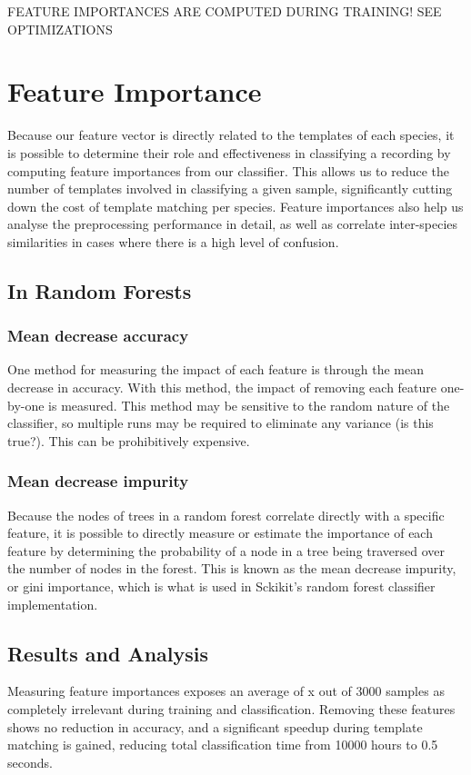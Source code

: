 FEATURE IMPORTANCES ARE COMPUTED DURING TRAINING! SEE OPTIMIZATIONS
\section{Feature Importance}\label{sec:feature_imp}
Because our feature vector is directly related to the templates of each species,
it is possible to determine their role and effectiveness in classifying a
recording by computing feature importances from our classifier.
This allows us to reduce the number of templates involved in classifying a given
sample, significantly cutting down the cost of template matching per species.
Feature importances also help us analyse the preprocessing performance in detail,
as well as correlate inter-species similarities in cases where there is a high
level of confusion.

\subsection{In Random Forests}

\subsubsection{Mean decrease accuracy}
One method for measuring the impact of each feature is through the mean decrease
in accuracy.
With this method, the impact of removing each feature one-by-one is measured.
This method may be sensitive to the random nature of the classifier, so multiple
runs may be required to eliminate any variance (is this true?).
This can be prohibitively expensive.

\subsubsection{Mean decrease impurity}
Because the nodes of trees in a random forest correlate directly with a specific
feature, it is possible to directly measure or estimate the importance of each
feature by determining the probability of a node in a tree being traversed over 
the number of nodes in the forest.
This is known as the mean decrease impurity, or gini importance, which is what
is used in Sckikit's random forest classifier implementation.

\subsection{Results and Analysis}

Measuring feature importances exposes an average of x out of 3000 samples as
completely irrelevant during training and classification.
Removing these features shows no reduction in accuracy, and a significant speedup
during template matching is gained, reducing total classification time from 10000
hours to 0.5 seconds.

